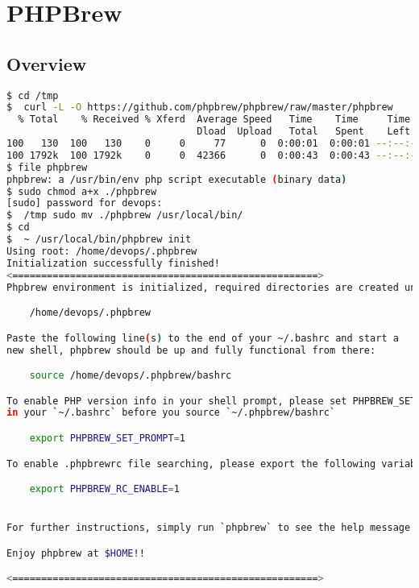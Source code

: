 \part{PHPBrew}

\chapter{Overview}

\begin{lstlisting}[language=bash]
$ cd /tmp 
$  curl -L -O https://github.com/phpbrew/phpbrew/raw/master/phpbrew
  % Total    % Received % Xferd  Average Speed   Time    Time     Time  Current
                                 Dload  Upload   Total   Spent    Left  Speed
100   130  100   130    0     0     77      0  0:00:01  0:00:01 --:--:--    77
100 1792k  100 1792k    0     0  42366      0  0:00:43  0:00:43 --:--:-- 34924
$ file phpbrew 
phpbrew: a /usr/bin/env php script executable (binary data)
$ sudo chmod a+x ./phpbrew 
[sudo] password for devops: 
$  /tmp sudo mv ./phpbrew /usr/local/bin/
$ cd
$  ~ /usr/local/bin/phpbrew init
Using root: /home/devops/.phpbrew
Initialization successfully finished!
<=====================================================>
Phpbrew environment is initialized, required directories are created under

    /home/devops/.phpbrew

Paste the following line(s) to the end of your ~/.bashrc and start a
new shell, phpbrew should be up and fully functional from there:

    source /home/devops/.phpbrew/bashrc

To enable PHP version info in your shell prompt, please set PHPBREW_SET_PROMPT=1
in your `~/.bashrc` before you source `~/.phpbrew/bashrc`

    export PHPBREW_SET_PROMPT=1

To enable .phpbrewrc file searching, please export the following variable:

    export PHPBREW_RC_ENABLE=1


For further instructions, simply run `phpbrew` to see the help message.

Enjoy phpbrew at $HOME!!

<=====================================================>
\end{lstlisting}